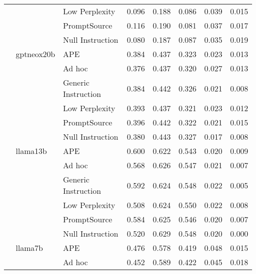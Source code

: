 \begin{supertabular}{lllrrrrr}
              &        & Low Perplexity &            0.096 &           0.188 &          0.086 &        0.039 &    0.015 \\
              &        & PromptSource &            0.116 &           0.190 &          0.081 &        0.037 &    0.017 \\
              &        & Null Instruction &            0.080 &           0.187 &          0.087 &        0.035 &    0.019 \\
              & gptneox20b & APE &            0.384 &           0.437 &          0.323 &        0.023 &    0.013 \\
              &        & Ad hoc &            0.376 &           0.437 &          0.320 &        0.027 &    0.013 \\
              &        & Generic Instruction &            0.384 &           0.442 &          0.326 &        0.021 &    0.008 \\
              &        & Low Perplexity &            0.393 &           0.437 &          0.321 &        0.023 &    0.012 \\
              &        & PromptSource &            0.396 &           0.442 &          0.322 &        0.021 &    0.015 \\
              &        & Null Instruction &            0.380 &           0.443 &          0.327 &        0.017 &    0.008 \\
              & llama13b & APE &            0.600 &           0.622 &          0.543 &        0.020 &    0.009 \\
              &        & Ad hoc &            0.568 &           0.626 &          0.547 &        0.021 &    0.007 \\
              &        & Generic Instruction &            0.592 &           0.624 &          0.548 &        0.022 &    0.005 \\
              &        & Low Perplexity &            0.508 &           0.624 &          0.550 &        0.022 &    0.008 \\
              &        & PromptSource &            0.584 &           0.625 &          0.546 &        0.020 &    0.007 \\
              &        & Null Instruction &            0.520 &           0.629 &          0.548 &        0.020 &      0.000 \\
              & llama7b & APE &            0.476 &           0.578 &          0.419 &        0.048 &    0.015 \\
              &        & Ad hoc &            0.452 &           0.589 &          0.422 &        0.045 &    0.018 \\

\end{supertabular}
